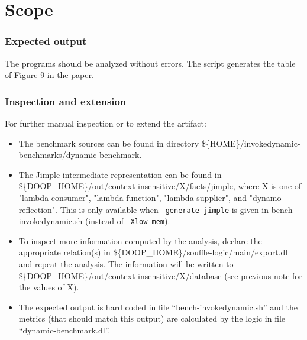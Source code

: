 \documentclass[a4paper,UKenglish]{darts-v2019}
\newenvironment{scope}{\section{Scope}}{}
\begin{document}
\begin{scope}
\subsubsection{Expected output}

The programs should be analyzed without errors. The script generates
the table of Figure 9 in the paper.

\subsubsection{Inspection and extension}
\label{sec:inspect-extend-b}

For further manual inspection or to extend the artifact:

\begin{itemize}
\item The benchmark sources can be found in directory
  \$\{HOME\}/invokedynamic-benchmarks/dynamic-benchmark.
\item The Jimple intermediate representation can be found in
  \$\{DOOP\_HOME\}/out/context-insensitive/X/facts/jimple, where X is one of
  "lambda-consumer", "lambda-function", "lambda-supplier", and
  "dynamo-reflection". This is only available when \texttt{--generate-jimple}
  is given in bench-invokedynamic.sh (instead of \texttt{--Xlow-mem}).
\item To inspect more information computed by the analysis, declare
  the appropriate relation(s) in
  \$\{DOOP\_HOME\}/souffle-logic/main/export.dl and repeat the
  analysis. The information will be written to
  \$\{DOOP\_HOME\}/out/context-insensitive/X/database (see previous
  note for the values of X).
\item The expected output is hard coded in file
  ``bench-invokedynamic.sh'' and the metrics (that should match this
  output) are calculated by the logic in file
  ``dynamic-benchmark.dl''.
\end{itemize}

\end{scope}
\end{document}
